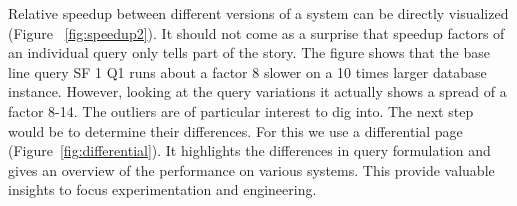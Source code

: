 \documentclass{cidr-2019}
\begin{document}
Relative speedup between different versions of a system can be directly visualized (Figure ~\ref{fig:speedup2}).
It should not come as a surprise that speedup factors of an individual query only tells part of the story.
The figure shows that the base line query SF 1 Q1 runs about a factor 8 slower on a 10 times larger database instance.
However, looking at the query variations it actually shows a spread of a factor 8-14. The outliers
are of particular interest to dig into. The next step would be to determine their differences.
For this we use a differential page (Figure~\ref{fig:differential}). It highlights the differences
in query formulation and gives an overview of the performance on various systems. 
This provide valuable insights to focus experimentation and engineering.





\end{document}
